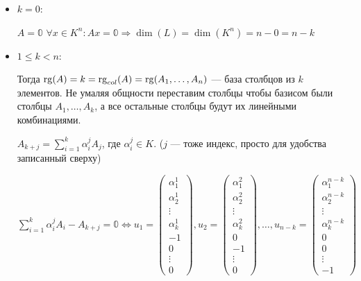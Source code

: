 \begin{itemize}
    \item \(k = 0\):

          \(A = \mathbb{0}\) \(\forall x \in K^n: Ax = \mathbb{0} \Rightarrow \dim(L) = \dim(K^n) = n - 0 = n - k\)

    \item \(1\leq k < n\):

          Тогда \(\operatorname{rg}(A) = k = \operatorname{rg}_{col}(A) = \operatorname{rg}(A_1, \ldots, A_n)\) --- база столбцов из \(k\) элементов. Не умаляя общности переставим столбцы чтобы базисом были столбцы \(A_1,\ldots, A_k\), а все остальные столбцы будут их линейными комбинациями.

          \(A_{k + j} = \sum\limits_{i = 1}^k \alpha_i^j A_j\), где \(\alpha_i^j \in K\). (\(j\) --- тоже индекс, просто для удобства записанный сверху)

          \(\sum\limits_{i = 1}^k \alpha_i^j A_i - A_{k + j} = \mathbb{0} \Leftrightarrow
          u_1 = \begin{pmatrix}
              \alpha_1^1 \\
              \alpha_2^1 \\
              \vdots     \\
              \alpha_k^1 \\
              -1         \\
              0          \\
              \vdots     \\
              0
          \end{pmatrix},
          u_2 = \begin{pmatrix}
              \alpha_1^2 \\
              \alpha_2^2 \\
              \vdots     \\
              \alpha_k^2 \\
              0          \\
              -1         \\
              \vdots     \\
              0
          \end{pmatrix}, \ldots,
          u_{n - k} = \begin{pmatrix}
              \alpha_1^{n - k} \\
              \alpha_2^{n - k} \\
              \vdots           \\
              \alpha_k^{n - k} \\
              0                \\
              0                \\
              \vdots           \\
              -1
          \end{pmatrix}\)


\end{itemize}
